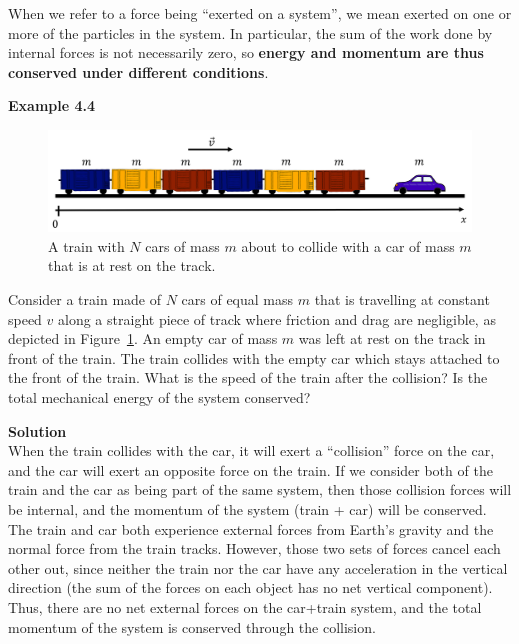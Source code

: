 \documentclass[9pt,arxiv,red]{lapreprint}
\begin{document}
When we refer to a force being ``exerted on a system'', we mean exerted on one or more of the particles in the system. In particular, the sum of the work done by internal forces is not necessarily zero, so \textbf{energy and momentum are thus conserved under different conditions}.

\begin{framed}
\textbf{Example 4.4}\\
\begin{figure}[!htbp]
\centering
\includegraphics[width=0.8\linewidth]{files/train-d2c8c3f4754121be98bc464317511478.png}
\caption[]{A train with $N$ cars of mass $m$ about to collide with a car of mass $m$ that is at rest on the track.}
\label{fig:momentumandcm:train}
\end{figure}

Consider a train made of $N$ cars of equal mass $m$ that is travelling at constant speed $v$ along a straight piece of track where friction and drag are negligible, as depicted in Figure~\ref{fig:momentumandcm:train}. An empty car of mass $m$ was left at rest on the track in front of the train. The train collides with the empty car which stays attached to the front of the train. What is the speed of the train after the collision? Is the total mechanical energy of the system conserved?

\begin{framed}
\textbf{Solution}\\
When the train collides with the car, it will exert a ``collision'' force on the car, and the car will exert an opposite force on the train. If we consider both of the train and the car as being part of the same system, then those collision forces will be internal, and the momentum of the system (train + car) will be conserved. The train and car both experience external forces from Earth's gravity and the normal force from the train tracks. However, those two sets of forces cancel each other out, since neither the train nor the car have any acceleration in the vertical direction (the sum of the forces on each object has no net vertical component). Thus, there are no net external forces on the car+train system, and the total momentum of the system is conserved through the collision.


\end{framed}
\end{framed}
\end{document}
